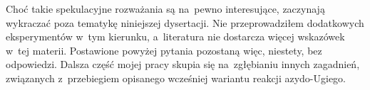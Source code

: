 Choć takie spekulacyjne rozważania są na~pewno interesujące, zaczynają wykraczać poza
  tematykę niniejszej dysertacji.
Nie przeprowadziłem dodatkowych eksperymentów w~tym kierunku, a~literatura nie dostarcza
  więcej wskazówek w~tej materii.
Postawione powyżej pytania pozostaną więc, niestety, bez odpowiedzi.
Dalsza część mojej pracy skupia się na~zgłębianiu innych zagadnień, związanych z~przebiegiem
  opisanego wcześniej wariantu reakcji azydo-Ugiego.
